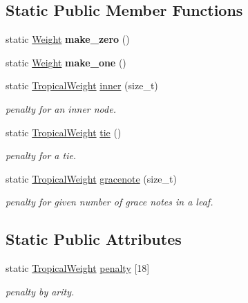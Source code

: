 \subsection*{Static Public Member Functions}
\begin{DoxyCompactItemize}
\item 
\mbox{\label{classTropicalWeight_a382ff71d1dbd27cfdaac24355df2f31e}} 
static \mbox{\hyperlink{classWeight}{Weight}} {\bfseries make\+\_\+zero} ()
\item 
\mbox{\label{classTropicalWeight_a0e2bd648171b8e72fc62d6ee8e7ad313}} 
static \mbox{\hyperlink{classWeight}{Weight}} {\bfseries make\+\_\+one} ()
\item 
static \mbox{\hyperlink{classTropicalWeight}{Tropical\+Weight}} \mbox{\hyperlink{group__weight_gace00a414884a9a4824c3cac4b8b084a9}{inner}} (size\+\_\+t)
\begin{DoxyCompactList}\small\item\em penalty for an inner node. \end{DoxyCompactList}\item 
static \mbox{\hyperlink{classTropicalWeight}{Tropical\+Weight}} \mbox{\hyperlink{group__weight_gad8d0422a24b5d4a76856191cc441396c}{tie}} ()
\begin{DoxyCompactList}\small\item\em penalty for a tie. \end{DoxyCompactList}\item 
static \mbox{\hyperlink{classTropicalWeight}{Tropical\+Weight}} \mbox{\hyperlink{group__weight_ga739a8c09964d0db9552f5924b494c89d}{gracenote}} (size\+\_\+t)
\begin{DoxyCompactList}\small\item\em penalty for given number of grace notes in a leaf. \end{DoxyCompactList}\end{DoxyCompactItemize}
\subsection*{Static Public Attributes}
\begin{DoxyCompactItemize}
\item 
static \mbox{\hyperlink{classTropicalWeight}{Tropical\+Weight}} \mbox{\hyperlink{group__weight_ga65ae4a5dbff3b9bf3d9972147868fc05}{penalty}} \mbox{[}18\mbox{]}
\begin{DoxyCompactList}\small\item\em penalty by arity. \end{DoxyCompactList}\end{DoxyCompactItemize}
